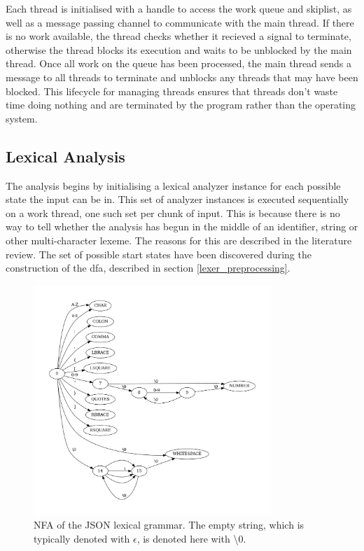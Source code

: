 Each thread is initialised with a handle to access the work queue and skiplist, as well as a message
passing channel to communicate with the main thread. If there is no work available, the thread
checks whether it recieved a signal to terminate, otherwise the thread blocks its execution and
waits to be unblocked by the main thread. Once all work on the queue has been processed, the main
thread sends a message to all threads to terminate and unblocks any threads that may have been
blocked. This lifecycle for managing threads ensures that threads don't waste time doing nothing and
are terminated by the program rather than the operating system.

\subsection{Lexical Analysis}

The analysis begins by initialising a lexical analyzer instance for each possible state the input can be in. This set of analyzer instances is executed sequentially on a work thread, one such set per chunk of input. This is because there is no way to tell whether the analysis has begun in the middle of an identifier, string or other multi-character lexeme. The reasons for this are described in the literature review. The set of possible start states have been discovered during the construction of the \gls{dfa}, described in section \ref{lexer_preprocessing}.

\begin{figure}[t]
\includegraphics[width=0.8\textwidth]{images/nfa.png}
\caption{NFA of the JSON lexical grammar. The empty string, which is typically denoted with $\epsilon$, is denoted here with \textbackslash0.}
\label{fig:nfa}
\end{figure}

